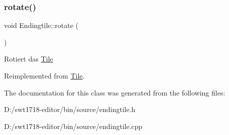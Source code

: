 \subsubsection{\texorpdfstring{rotate()}{rotate()}}
{\footnotesize\ttfamily void Endingtile\+::rotate (\begin{DoxyParamCaption}{ }\end{DoxyParamCaption})\hspace{0.3cm}{\ttfamily [virtual]}}

Rotiert das \mbox{\hyperlink{class_tile}{Tile}} 

Reimplemented from \mbox{\hyperlink{class_tile_a15c3d8260c8950d3461e3ba2849cd141}{Tile}}.



The documentation for this class was generated from the following files\+:\begin{DoxyCompactItemize}
\item 
D\+:/swt1718-\/editor/bin/source/endingtile.\+h\item 
D\+:/swt1718-\/editor/bin/source/endingtile.\+cpp\end{DoxyCompactItemize}
